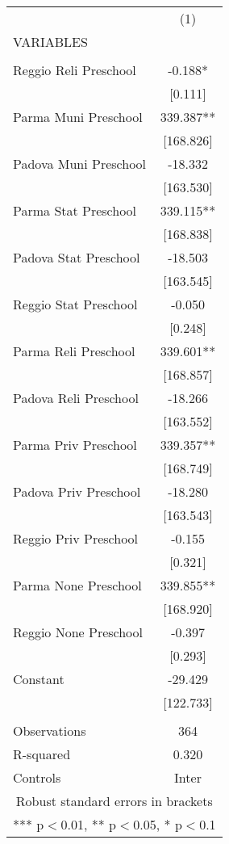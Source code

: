 \begin{tabular}{lc} \hline
 & (1) \\
VARIABLES &  \\ \hline
 &  \\
Reggio Reli Preschool & -0.188* \\
 & [0.111] \\
Parma Muni Preschool & 339.387** \\
 & [168.826] \\
Padova Muni Preschool & -18.332 \\
 & [163.530] \\
Parma Stat Preschool & 339.115** \\
 & [168.838] \\
Padova Stat Preschool & -18.503 \\
 & [163.545] \\
Reggio Stat Preschool & -0.050 \\
 & [0.248] \\
Parma Reli Preschool & 339.601** \\
 & [168.857] \\
Padova Reli Preschool & -18.266 \\
 & [163.552] \\
Parma Priv Preschool & 339.357** \\
 & [168.749] \\
Padova Priv Preschool & -18.280 \\
 & [163.543] \\
Reggio Priv Preschool & -0.155 \\
 & [0.321] \\
Parma None Preschool & 339.855** \\
 & [168.920] \\
Reggio None Preschool & -0.397 \\
 & [0.293] \\
Constant & -29.429 \\
 & [122.733] \\
 &  \\
Observations & 364 \\
R-squared & 0.320 \\
 Controls & Inter \\ \hline
\multicolumn{2}{c}{ Robust standard errors in brackets} \\
\multicolumn{2}{c}{ *** p$<$0.01, ** p$<$0.05, * p$<$0.1} \\
\end{tabular}
